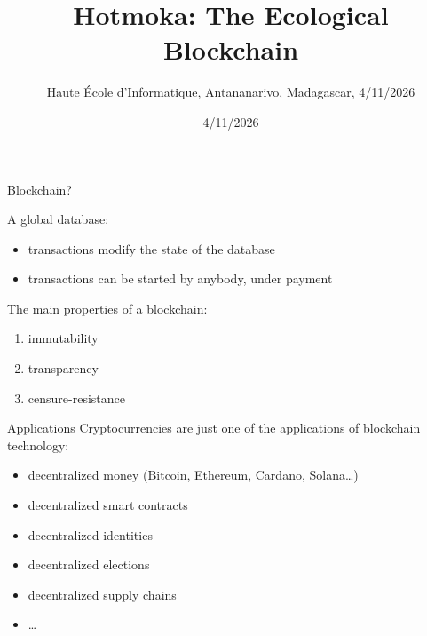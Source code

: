 \documentclass[11pt]{beamer}  %
\subtitle{Haute \'Ecole d'Informatique, Antananarivo, Madagascar, 4/11/2026}
\title{Hotmoka: The Ecological Blockchain}
\institute{Universit\`a di Verona, Italy}
\date{4/11/2026}
\begin{document}
\begin{frame}
  \titlepage
\end{frame}

\begin{frame}{Blockchain?}

  A global database:
  \begin{itemize}
  \item transactions modify the state of the database
  \item transactions can be started by anybody, under payment
  \end{itemize}
  \bigskip
  The main properties of a blockchain:
  \begin{enumerate}
  \item immutability
  \item transparency
  \item censure-resistance
  \end{enumerate}

\end{frame}

\begin{frame}{Applications}
  Cryptocurrencies are just one of the applications of blockchain technology:
  \begin{itemize}
  \item decentralized money (Bitcoin, Ethereum, Cardano, Solana\ldots)
  \item decentralized smart contracts
  \item decentralized identities
  \item decentralized elections
  \item decentralized supply chains
  \item \ldots
  \end{itemize}
\end{frame}
\end{document}
